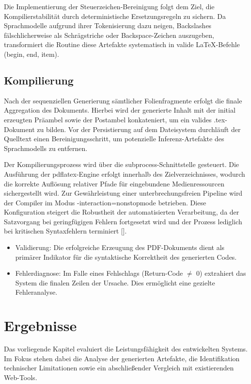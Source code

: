 \documentclass[a4paper]{article}
\begin{document}
Die Implementierung der Steuerzeichen-Bereinigung folgt dem Ziel, die Kompilierstabilität durch deterministische Ersetzungsregeln zu sichern. Da Sprachmodelle aufgrund ihrer Tokenisierung dazu neigen, Backslashes fälschlicherweise als Schrägstriche oder Backspace-Zeichen auszugeben, transformiert die Routine diese Artefakte systematisch in valide LaTeX-Befehle (begin, end, item).

\subsection{Kompilierung} 
Nach der sequenziellen Generierung sämtlicher Folienfragmente erfolgt die finale Aggregation des Dokuments. Hierbei wird der generierte Inhalt mit der initial erzeugten Präambel sowie der Postambel konkateniert, um ein valides {.tex}-Dokument zu bilden. Vor der Persistierung auf dem Dateisystem durchläuft der Quelltext einen Bereinigungsschritt, um potenzielle Inferenz-Artefakte des Sprachmodells zu entfernen.

Der Kompilierungsprozess wird über die {subprocess}-Schnittstelle gesteuert. Die Ausführung der {pdflatex}-Engine erfolgt innerhalb des Zielverzeichnisses, wodurch die korrekte Auflösung relativer Pfade für eingebundene Medienressourcen sichergestellt wird. Zur Gewährleistung einer unterbrechungsfreien Pipeline wird der Compiler im Modus {-interaction=nonstopmode} betrieben. Diese Konfiguration steigert die Robustheit der automatisierten Verarbeitung, da der Satzvorgang bei geringfügigen Fehlern fortgesetzt wird und der Prozess lediglich bei kritischen Syntaxfehlern terminiert [\cite{Eijkhout1991}].
\begin{itemize}
	\item {Validierung}: Die erfolgreiche Erzeugung des PDF-Dokuments dient als primärer Indikator für die syntaktische Korrektheit des generierten Codes.
	\item {Fehlerdiagnose}: Im Falle eines Fehlschlags (Return-Code $\neq$ 0) extrahiert das System die finalen Zeilen der Ursache. Dies ermöglicht eine gezielte Fehleranalyse.
\end{itemize}



\section{Ergebnisse} Das vorliegende Kapitel evaluiert die Leistungsfähigkeit des entwickelten Systems. Im Fokus stehen dabei die Analyse der generierten Artefakte, die Identifikation technischer Limitationen sowie ein abschließender Vergleich mit existierenden Web-Tools.
\end{document}
